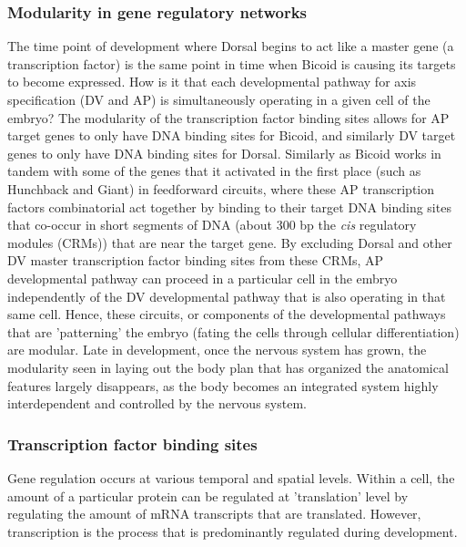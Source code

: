\subsubsection{Modularity in gene regulatory networks}

 The time point of development where Dorsal begins to act like a master gene (a transcription factor) is the same point in time when Bicoid is causing its targets to become expressed.  How is it that each developmental pathway for axis specification (DV and AP) is simultaneously operating in a given cell of the embryo?  The modularity of the transcription factor binding sites allows for AP target genes to only have DNA binding sites for Bicoid, and similarly DV target genes to only have DNA binding sites for Dorsal.  Similarly as Bicoid works in tandem with some of the genes that it activated in the first place (such as Hunchback and Giant) in feedforward circuits, where these AP transcription factors combinatorial act together by binding to their target DNA binding sites that co-occur in short segments of DNA (about 300 bp the \textit{cis} regulatory modules (CRMs)) that are near the target gene.  By excluding Dorsal and other DV master transcription factor binding sites from these CRMs, AP developmental pathway can proceed in a particular cell in the embryo independently of the DV developmental pathway that is also operating in that same cell.  Hence, these circuits, or components of the developmental pathways that are 'patterning' the embryo (fating the cells through cellular differentiation) are modular.  Late in development, once the nervous system has grown, the modularity seen in laying out the body plan that has organized the anatomical features largely disappears, as the body becomes an integrated system highly interdependent and controlled by the nervous system.

\subsubsection{Transcription factor binding sites}
Gene regulation occurs at various temporal and spatial levels.  Within a cell, the amount of a particular protein can be regulated at 'translation' level by regulating the amount of mRNA transcripts that are translated.  However, transcription is the process that is predominantly regulated during development.  

